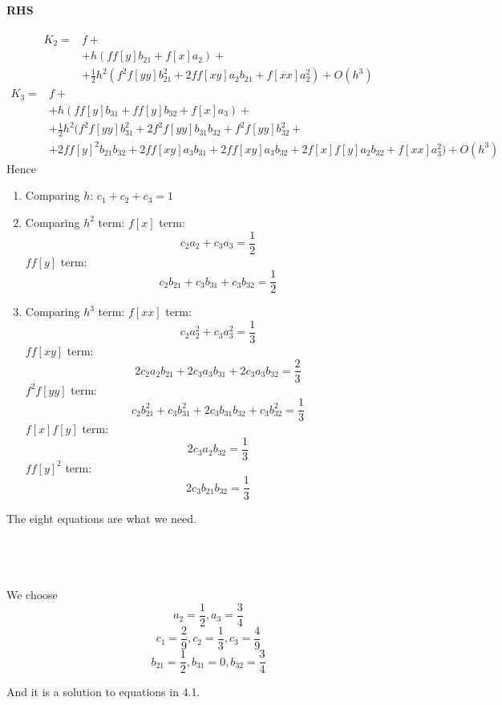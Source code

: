 \documentclass{article}
\begin{document}
\paragraph{RHS}
\begin{equation}
\begin{split}
K_2 =& f + \\
&+ h(ff[y]b_{21} + f[x]a_2) + \\
&+ \frac{1}{2}h^2(f^2f[yy]b_{21}^2 + 2ff[xy]a_2 b_{21} + f[xx]a_2^2) + O(h^3)
\end{split}
\end{equation}
\begin{equation}
\begin{split}
K_3 =& f + \\
&+ h(ff[y]b_{31} + ff[y]b_{32} +  f[x]a_3) + \\
&+ \frac{1}{2}h^2(f^2f[yy]b_{31}^2 + 2f^2f[yy]b_{31}b_{32} + f^2f[yy]b_{32}^2 +\\
&+2ff[y]^2 b_{21}b_{32} + 2ff[xy]a_3b_{31} + 2ff[xy]a_3b_{32} + 2f[x]f[y] a_2b_{32}+ f[xx]a_3^2) + O(h^3)
\end{split}
\end{equation}
Hence 
\begin{enumerate}
	\item Comparing $h$: $c_1 + c_2 + c_3 = 1$
	\item Comparing $h^2$ term:
		$f[x]$ term: $$c_2a_2 + c_3a_3 = \frac{1}{2}$$
		$ff[y]$ term: $$c_2b_{21} + c_3b_{31} + c_{3}b_{32} = \frac{1}{2}$$
	\item Comparing $h^3$ term:
		$f[xx]$ term:
			$$c_2a_2^2 + c_3a_3^2 = \frac{1}{3}$$
		$ff[xy]$ term:
		$$2c_2a_2b_{21} + 2c_3a_3b_{31} + 2c_3a_3b_{32} = \frac{2}{3}$$
		$f^2f[yy]$ term:
		$$c_2b_{21}^2 + c_3b_{31}^2 + 2c_3b_{31}b_{32} + c_3 b_{32}^2 = \frac 13$$
		$f[x]f[y]$ term:
		$$2c_3a_2b_{32} = \frac 13$$
		$ff[y]^2$ term:
		$$2c_3b_{21}b_{32} = \frac 13$$
\end{enumerate}

The eight equations are what we need.
\subsection{~}
We choose 
$$a_2 = \frac 12 , a_3 = \frac 34$$
$$c_{1} = \frac 29, c_2 = \frac 13, c_3 = \frac 49$$
$$b_{21} = \frac 12, b_{31} = 0, b_{32} = \frac 34$$

And it is a solution to equations in 4.1.
\end{document}
